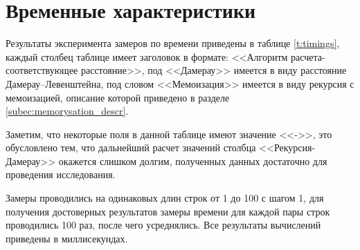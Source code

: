 \clearpage

\section{Временные характеристики}

Результаты эксперимента замеров по времени приведены в таблице \ref{t:timings}, каждый столбец таблице имеет заголовок в формате:
<<Алгоритм расчета-соответствующее расстояние>>, под <<Дамерау>> имеется в виду расстояние Дамерау--Левенштейна, под словом
<<Мемоизация>> имеется в виду  рекурсия с мемоизацией, описание которой приведено в разделе \ref{subec:memorysation_descr}.

Заметим, что некоторые поля в данной таблице
имеют значение <<->>, это обусловлено тем, что дальнейший расчет значений столбца <<Рекурсия-Дамерау>> окажется слишком
долгим, полученных данных достаточно для проведения исследования.

Замеры проводились на одинаковых длин строк от 1 до 100 с шагом 1, для получения достоверных результатов замеры 
времени для каждой пары строк проводились 100 раз, после чего усреднялись. Все результаты вычислений приведены в миллисекундах.


